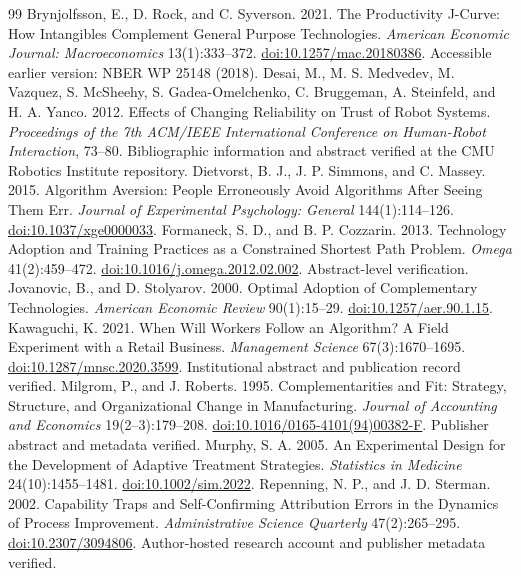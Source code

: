 \documentclass[11pt]{article}
\begin{document}
{\begin{thebibliography}{99}
 Brynjolfsson, E., D. Rock, and C. Syverson. 2021. The Productivity J-Curve: How Intangibles Complement General Purpose Technologies. \emph{American Economic Journal: Macroeconomics} 13(1):333--372. \href{https://doi.org/10.1257/mac.20180386}{doi:10.1257/mac.20180386}. Accessible earlier version: NBER WP 25148 (2018).
 Desai, M., M. S. Medvedev, M. Vazquez, S. McSheehy, S. Gadea-Omelchenko, C. Bruggeman, A. Steinfeld, and H. A. Yanco. 2012. Effects of Changing Reliability on Trust of Robot Systems. \emph{Proceedings of the 7th ACM/IEEE International Conference on Human-Robot Interaction}, 73--80. Bibliographic information and abstract verified at the CMU Robotics Institute repository.
 Dietvorst, B. J., J. P. Simmons, and C. Massey. 2015. Algorithm Aversion: People Erroneously Avoid Algorithms After Seeing Them Err. \emph{Journal of Experimental Psychology: General} 144(1):114--126. \href{https://doi.org/10.1037/xge0000033}{doi:10.1037/xge0000033}.
 Formaneck, S. D., and B. P. Cozzarin. 2013. Technology Adoption and Training Practices as a Constrained Shortest Path Problem. \emph{Omega} 41(2):459--472. \href{https://doi.org/10.1016/j.omega.2012.02.002}{doi:10.1016/j.omega.2012.02.002}. Abstract-level verification.
 Jovanovic, B., and D. Stolyarov. 2000. Optimal Adoption of Complementary Technologies. \emph{American Economic Review} 90(1):15--29. \href{https://doi.org/10.1257/aer.90.1.15}{doi:10.1257/aer.90.1.15}.
 Kawaguchi, K. 2021. When Will Workers Follow an Algorithm? A Field Experiment with a Retail Business. \emph{Management Science} 67(3):1670--1695. \href{https://doi.org/10.1287/mnsc.2020.3599}{doi:10.1287/mnsc.2020.3599}. Institutional abstract and publication record verified.
 Milgrom, P., and J. Roberts. 1995. Complementarities and Fit: Strategy, Structure, and Organizational Change in Manufacturing. \emph{Journal of Accounting and Economics} 19(2--3):179--208. \href{https://doi.org/10.1016/0165-4101(94)00382-F}{doi:10.1016/0165-4101(94)00382-F}. Publisher abstract and metadata verified.
 Murphy, S. A. 2005. An Experimental Design for the Development of Adaptive Treatment Strategies. \emph{Statistics in Medicine} 24(10):1455--1481. \href{https://doi.org/10.1002/sim.2022}{doi:10.1002/sim.2022}.
 Repenning, N. P., and J. D. Sterman. 2002. Capability Traps and Self-Confirming Attribution Errors in the Dynamics of Process Improvement. \emph{Administrative Science Quarterly} 47(2):265--295. \href{https://doi.org/10.2307/3094806}{doi:10.2307/3094806}. Author-hosted research account and publisher metadata verified.

\end{thebibliography}}
\end{document}
